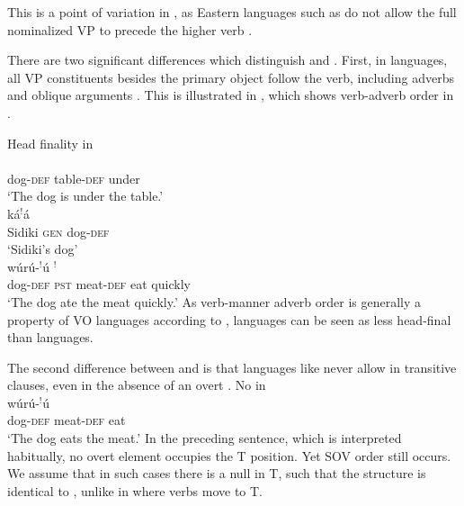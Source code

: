 \documentclass[output=paper]{LSP/langsci}
\begin{document}
This is a point of variation in , as Eastern  languages such as  do not allow the full nominalized VP to precede the higher verb \citep{nikitina09}.

There are two significant differences which distinguish  and . First, in  languages, all VP constituents besides the primary object follow the verb, including adverbs and oblique arguments \citep{nikitina09}. This is illustrated in , which shows verb-adverb order in .

\ea Head finality in  \label{ex:8:dafing}
 \\
\gll {} \textbf{} \textbf{} \\
dog-\textsc{def} table-\textsc{def} under \\
\glt  `The dog is under the table.'  \label{ex:8a:dafing}
\\
\gll \textbf{} k\'a$^!$\'a \textbf{} \\
Sidiki \textsc{gen} dog-\textsc{def} \\
\glt `Sidiki's dog' \label{ex:8b:dafing}
\\
\gll w\'ur\'u-$^!$\'u {$^!$}  \textbf{} \textbf{} \\
{dog}-\textsc{def} \textsc{pst} meat-\textsc{def} eat quickly\\
\glt `The dog ate the meat quickly.' \label{ex:8c:dafing}
\z
\z
As verb-manner adverb order is generally a property of VO languages according to \citet{dryer07},  languages can be seen as less head-final than  languages.

The second difference between  and  is that  languages like  never allow  in transitive clauses, even in the absence of an overt . %
\ea No  in \\
\gll w\'ur\'u-$^!$\'u {}  \textbf{} \\
{dog}-\textsc{def} {} meat-\textsc{def} eat\\
\glt `The dog eats the meat.'
\z
In the preceding sentence, which is interpreted habitually, no overt  element occupies the T position. Yet SOV order still occurs. We assume that in such cases there is a null  in T, such that the structure is identical to , unlike in  where verbs move to T.
\end{document}
